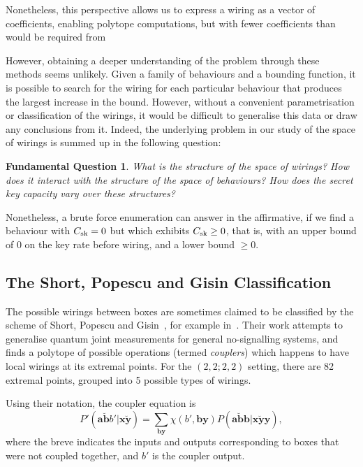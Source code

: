 \documentclass[10pt, a4paper]{article}
\numberwithin{equation}{section} %
\theoremstyle{definition}
\theoremstyle{plain}
\newtheorem{funqn}{Fundamental Question}
\newcommand{\?}{\mathrel{?}} %
\newcommand{\cvec}[1]{\boldsymbol{\mathbf{#1}}}    %
\newcommand{\sk}{\rm sk}
\begin{document}
      Nonetheless, this perspective allows us to express a wiring as a vector of coefficients, enabling polytope computations, but with fewer coefficients than would be required from 

      However, obtaining a deeper understanding of the problem through these methods seems unlikely. Given a family of behaviours and a bounding function, it is possible to search for the wiring for each particular behaviour that produces the largest increase in the bound. However, without a convenient parametrisation or classification of the wirings, it would be difficult to generalise this data or draw any conclusions from it. Indeed, the underlying problem in our study of the space of wirings is summed up in the following question:
      \begin{funqn}\label{fqn:wir}
        What is the structure of the space of wirings? How does it interact with the structure of the space of behaviours? How does the secret key capacity vary over these structures?
      \end{funqn}

      Nonetheless, a brute force enumeration can answer  in the affirmative, if we find a behaviour with \(C_{\sk} = 0\) but which exhibits \(C_{\sk} \geq 0\), that is, with an upper bound of 0 on the key rate before wiring, and a lower bound \(\geq 0\).

      \subsection{The Short, Popescu and Gisin Classification}\label{sec:locwir_class}

      The possible wirings between boxes are sometimes claimed to be classified by the scheme of Short, Popescu and Gisin~\cite{ShortEntangleSwap}, for example in~\cite{ShortClassClaim}. Their work attempts to generalise quantum joint measurements for general no-signalling systems, and finds a polytope of possible operations (termed \emph{couplers}) which happens to have local wirings at its extremal points. For the  \((2,2;2,2)\) setting, there are 82 extremal points, grouped into 5 possible types of wirings.

      Using their notation, the coupler equation is~\cite[Eq. 29]{ShortEntangleSwap}
      \begin{equation}
        P'(\cvec{a\breve{b}}b'|\cvec{x\breve{y}}) = \sum_{\cvec{by}} \chi(b',\cvec{by})P(\cvec{a\breve{b}b}|\cvec{x\breve{y}y}),
      \end{equation}
      where the breve indicates the inputs and outputs corresponding to boxes that were not coupled together, and \(b'\) is the coupler output.
\end{document}
